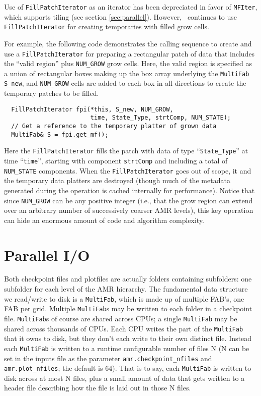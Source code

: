 Use of {\tt FillPatchIterator} as an iterator has been depreciated in favor
of {\tt MFIter}, which supports tiling (see section \ref{sec:parallel}).
However, \iamr\ continues to use
{\tt FillPatchIterator} for creating temporaries with filled grow cells.

For example, the following code demonstrates the calling sequence to
create and use a {\tt FillPatchIterator} for preparing a rectangular patch of 
data that includes the ``valid region'' plus {\tt NUM\_GROW} grow cells.  Here,
the valid region is specified as a union of rectangular boxes making up the 
box array underlying the {\tt MultiFab S\_new}, and {\tt NUM\_GROW} cells are 
added to each box in all directions to create the temporary patches to
be filled.  

\begin{lstlisting}
  FillPatchIterator fpi(*this, S_new, NUM_GROW,
                        time, State_Type, strtComp, NUM_STATE);
  // Get a reference to the temporary platter of grown data
  MultiFab& S = fpi.get_mf();
\end{lstlisting}
Here the {\tt FillPatchIterator} fills the patch 
with data of type ``{\tt State\_Type}'' at time ``{\tt time}'',
starting with component {\tt strtComp} and including a total of
{\tt NUM\_STATE} components. When the {\tt FillPatchIterator} goes out of scope, it 
and the temporary data platters are destroyed (though much of the 
metadata generated during the operation is cached internally
for performance).  Notice that since {\tt NUM\_GROW} can be any
positive integer (i.e., that the grow region can extend over an arbitrary 
number of successively coarser AMR levels), this key operation can hide an
enormous amount of code and algorithm complexity.

\section{Parallel I/O}

Both checkpoint files and plotfiles are actually folders containing
subfolders: one subfolder for each level of the AMR hierarchy.
The fundamental data structure we read/write to disk is a {\tt MultiFab},
which is made up of multiple FAB's, one FAB per grid.  Multiple
{\tt MultiFab}s may be written to each folder in a checkpoint file.
{\tt MultiFab}s of course are shared across CPUs; a single {\tt MultiFab} may be
shared across thousands of CPUs.  Each CPU writes the part of the
{\tt MultiFab} that it owns to disk, but they don't each write to their own
distinct file.  Instead each {\tt MultiFab} is written to a runtime
configurable number of files N (N can be set in the inputs file as the
parameter {\tt amr.checkpoint\_nfiles} and {\tt amr.plot\_nfiles}; the
default is 64).  That is to say, each {\tt MultiFab} is written to disk
across at most N files, plus a small amount of data that gets written
to a header file describing how the file is laid out in those N files.

